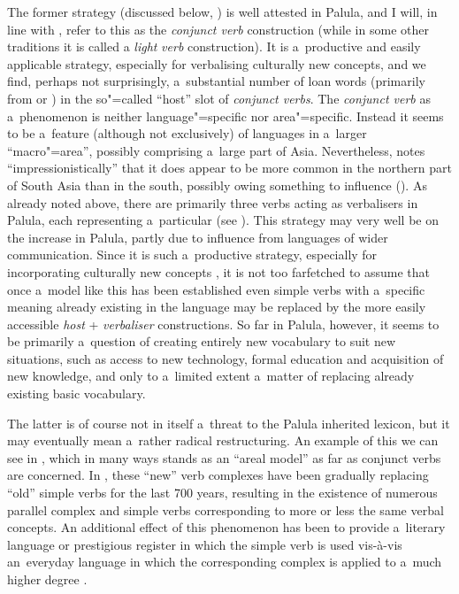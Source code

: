 The former strategy (discussed below, ) is well attested in Palula, and I will, in line with \citet[326]{masica1991}, refer to this as the \textit{conjunct verb} construction (while in some other traditions it is called a \textit{light} \textit{verb} construction). It is a~productive and easily applicable strategy, especially for verbalising culturally new concepts, and we find, perhaps not surprisingly, a~substantial number of loan words (primarily from \iliUrdu or \iliPashto) in the so"=called ``host'' slot of \textit{conjunct verbs}. The \textit{conjunct verb} as a~phenomenon is neither language"=specific nor area"=specific. Instead it seems to be a~feature (although not exclusively) of languages in a~larger ``macro"=area'', possibly comprising a~large part of Asia. Nevertheless, \citeauthor{masica1991} notes ``impressionistically'' that it does appear to be more common in the northern part of South Asia than in the south, possibly owing something to \iliPersian influence (\citeyear[368]{masica1991}). As already noted above, there are primarily three verbs acting as verbalisers in Palula, each representing a~particular  (see ). This strategy may very well be on the increase in Palula, partly due to influence from languages of wider communication. Since it is such a~productive strategy, especially for incorporating culturally new concepts \citep[85]{gambhir1993}, it is not too farfetched to assume that once a~model like this has been established even simple verbs with a~specific meaning already existing in the language may be replaced by the more easily accessible \textit{host} + \textit{verbaliser} constructions. So far in Palula, however, it seems to be primarily a~question of creating entirely new vocabulary to suit new situations, such as access to new technology, formal education and acquisition of new knowledge, and only to a~limited extent a~matter of replacing already existing basic vocabulary. 



The latter is of course not in itself a~threat to the Palula inherited lexicon, but it may eventually mean a~rather radical restructuring. An example of this we can see in \iliPersian, which in many ways stands as an ``areal model'' as far as conjunct verbs are concerned. In \iliPersian, these ``new'' verb complexes have been gradually replacing ``old'' simple verbs for the last 700 years, resulting in the existence of numerous parallel complex and simple verbs corresponding to more or less the same verbal concepts. An additional effect of this phenomenon has been to provide a~literary language or prestigious register in which the simple verb is used vis-à-vis an~everyday language in which the corresponding complex  is applied to a~much higher degree \citep[1369]{follietal2005}. 


